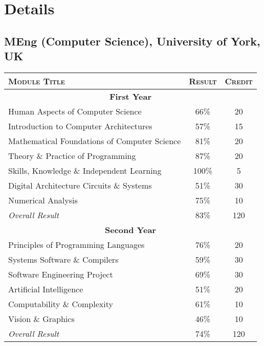 \documentclass[a4paper,10pt]{article}
\newcommand{\detail}[2]{\hypertarget{details:#1}{\subsection{#2}}}
\begin{document}
\section{Details}

\detail{csyork}{MEng (Computer Science), University of York, UK}
\begin{tabular}{p{11cm}|c|c}
  \hline
  \textsc{Module Title}                        & \textsc{Result} & \textsc{Credit}\\

  \hline \multicolumn{3}{c}{\textbf{First Year}} \\ \hline
  Human Aspects of Computer Science            & 66\%            & 20\\
  Introduction to Computer Architectures       & 57\%            & 15\\
  Mathematical Foundations of Computer Science & 81\%            & 20\\
  Theory \& Practice of Programming            & 87\%            & 20\\
  Skills, Knowledge \& Independent Learning    & 100\%           & 5\\
  Digital Architecture Circuits \& Systems     & 51\%            & 30\\
  Numerical Analysis                           & 75\%            & 10\\
  \hline \textit{Overall Result}               & 83\%            & 120\\

  \hline \multicolumn{3}{c}{\textbf{Second Year}} \\ \hline
  Principles of Programming Languages          & 76\%            & 20\\
  Systems Software \& Compilers                & 59\%            & 30\\
  Software Engineering Project                 & 69\%            & 30\\
  Artificial Intelligence                      & 51\%            & 20\\
  Computability \& Complexity                  & 61\%            & 10\\
  Vision \& Graphics                           & 46\%            & 10\\
  \hline \textit{Overall Result}               & 74\%            & 120\\
  \hline
\end{tabular}
\end{document}
